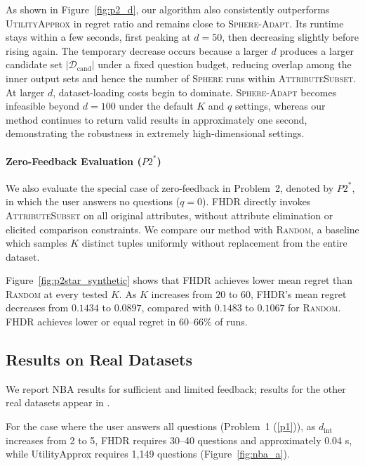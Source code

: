 As shown in Figure~\ref{fig:p2_d}, our algorithm also consistently outperforms \textsc{UtilityApprox} in regret ratio and remains close to \textsc{Sphere-Adapt}. Its runtime stays within a few seconds, first peaking at $d=50$, then decreasing slightly before rising again. The temporary decrease occurs because a larger $d$ produces a larger candidate set $|\mathcal{D}_\text{cand}|$ under a fixed question budget, reducing overlap among the inner output sets and hence the number of \textsc{Sphere} runs within \textsc{AttributeSubset}. At larger $d$, dataset-loading costs begin to dominate. \textsc{Sphere-Adapt} becomes infeasible beyond $d=100$ under the default $K$ and $q$ settings, whereas our method continues to return valid results in approximately one second, demonstrating the robustness in extremely high-dimensional settings.

\paragraph*{Zero-Feedback Evaluation ($P2^{*}$)}
We also evaluate the special case of zero-feedback in Problem~2, denoted by $P2^{*}$, in which the user answers no questions ($q=0$). FHDR directly invokes \textsc{AttributeSubset} on all original attributes, without attribute elimination or elicited comparison constraints. We compare our method with \textsc{Random}, a baseline which samples $K$ distinct tuples uniformly without replacement from the entire dataset.

Figure~\ref{fig:p2star_synthetic} shows that FHDR achieves lower mean regret than \textsc{Random} at every tested $K$. As $K$ increases from $20$ to $60$, FHDR’s mean regret decreases from $0.1434$ to $0.0897$, compared with $0.1483$ to $0.1067$ for \textsc{Random}. FHDR achieves lower or equal regret in $60$--$66\%$ of runs.

\subsection{Results on Real Datasets}
We report NBA results for sufficient and limited feedback; results for the other real datasets appear in \iftoggle{TechnicalReport}{Section~\ref{appen:real} of the \technicalreport}{Appendix~\ref{appen:real}}.

For the case where the user answers all questions (Problem~1 (\ref{p1})), as \(d_{\text{int}}\) increases from 2 to 5, FHDR requires 30–40 questions and approximately 0.04 s, while UtilityApprox requires 1,149 questions (Figure~\ref{fig:nba_a}).

